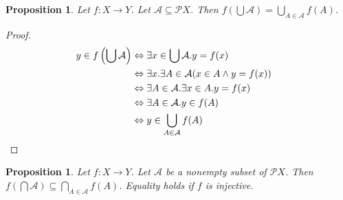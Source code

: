 \documentclass{report}
\let\qed\relax
\newtheorem{prop}[ax]{Proposition}
\theoremstyle{definition}
\begin{document}
\begin{prop}
Let $f : X \rightarrow Y$. Let $\mathcal{A} \subseteq \mathcal{P} X$. Then $f \left( \bigcup \mathcal{A} \right) = \bigcup_{A \in \mathcal{A}} f(A)$.
\end{prop}

\begin{proof}
\pf
\begin{align*}
y \in f \left( \bigcup \mathcal{A} \right)
& \Leftrightarrow \exists x \in \bigcup \mathcal{A}. y = f(x) \\
& \Leftrightarrow \exists x. \exists A \in \mathcal{A} (x \in A \wedge y = f(x)) \\
& \Leftrightarrow \exists A \in \mathcal{A}. \exists x \in A. y = f(x) \\
& \Leftrightarrow \exists A \in \mathcal{A}. y \in f(A) \\
& \Leftrightarrow y \in \bigcup_{A \in \mathcal{A}} f(A) & \qed
\end{align*}
\end{proof}

\begin{prop}
Let $f : X \rightarrow Y$. Let $\mathcal{A}$ be a nonempty subset of $\mathcal{P} X$. Then $f \left( \bigcap \mathcal{A} \right) \subseteq \bigcap_{A \in \mathcal{A}} f(A)$. Equality holds if $f$ is injective.
\end{prop}
\end{document}
